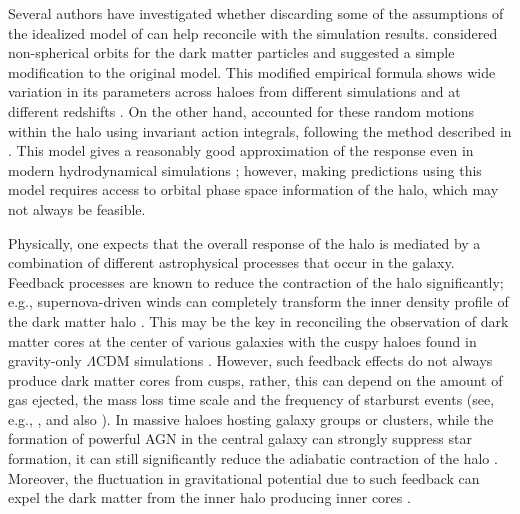 Several authors have investigated whether discarding some of the assumptions of the idealized model of \citet[][]{1986ApJ...301...27B} can help reconcile with the simulation results. \citet{2004ApJ...616...16G} considered non-spherical orbits for the dark matter particles and suggested a simple modification to the original model. This modified empirical formula shows wide variation in its parameters across haloes from different simulations and at different redshifts \citep[][]{2006PhRvD..74l3522G,2010MNRAS.405.2161D}. On the other hand, \citet[][]{2005ApJ...634...70S} accounted for these random motions within the halo using invariant action integrals, following the method described in \citet{1980ApJ...242.1232Y}. This model gives a reasonably good approximation of the response even in modern hydrodynamical simulations \citep{2020MNRAS.495...12C}; 
however, making predictions using this model requires access to orbital phase space information of the halo, which may not always be feasible.

Physically, one expects that the overall response of the halo is mediated by a combination of different astrophysical processes that occur in the galaxy. Feedback processes are known to reduce the contraction of the halo significantly; e.g.,
supernova-driven winds can completely transform the inner density profile of the dark matter halo
\citep[][]{1996MNRAS.283L..72N}. This may be the key in reconciling the observation of dark matter cores at the center of various galaxies with the cuspy haloes found in gravity-only $\Lambda$CDM simulations \citep[see][for a review]{2014Natur.506..171P}.
However, such feedback effects do not always produce dark matter cores from cusps, rather, this can depend on the amount of gas ejected, the mass loss time scale and the frequency of starburst events 
(see, e.g., \citealp{2011ApJ...736L...2O,2014ApJ...793...46O,2012MNRAS.421.3464P}, and also \citealp{bfln18}).
In massive haloes hosting galaxy groups or clusters, while the formation of powerful AGN in the central galaxy can strongly suppress star formation,
it can still significantly reduce the adiabatic contraction of the halo \citep[][]{2011MNRAS.414..195T}.
Moreover, the fluctuation in gravitational potential due to such feedback can expel the dark matter from the inner halo producing inner cores \citep[][]{2012MNRAS.422.3081M}.

